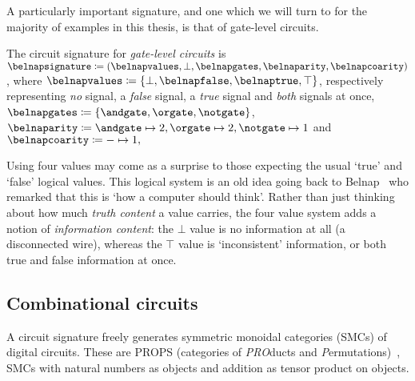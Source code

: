\documentclass{lmcs}
\begin{document}
A particularly important signature, and one which we will turn to for the
majority of examples in this thesis, is that of gate-level circuits.

\begin{exa}\label{ex:belnap-signature}
    The circuit signature for \emph{gate-level circuits} is \(
    \belnapsignature \coloneqq (
    \belnapvalues,
    \bot,
    \belnapgates,
    \belnaparity,
    \belnapcoarity
    )\), where \(
    \belnapvalues \coloneqq \{\bot, \belnapfalse, \belnaptrue, \top\}
    \), respectively representing \emph{no} signal, a \emph{false} signal, a
    \emph{true} signal and \emph{both} signals at once, \(
    \belnapgates \coloneqq \{\andgate,\orgate,\notgate\}
    \), \(
    \belnaparity \coloneqq
    \andgate \mapsto 2,
    \orgate \mapsto 2,
    \notgate \mapsto 1
    \) and \(
    \belnapcoarity \coloneqq - \mapsto 1,
    \)
\end{exa}

\begin{rem}
    Using four values may come as a surprise to those expecting the usual
    `true' and `false' logical values.
    This logical system is an old idea going back to
    Belnap~\cite{belnap1977useful} who remarked that this is `how a computer
    should think'.
    Rather than just thinking about how much \emph{truth content} a value
    carries, the four value system adds a notion of \emph{information content}:
    the \(\bot\) value is no information at all (a disconnected wire), whereas
    the \(\top\) value is `inconsistent' information, or both true and false
    information at once.
\end{rem}

\subsection{Combinational circuits}

A circuit signature freely generates symmetric monoidal categories (SMCs) of
digital circuits.
These are PROPS (categories of \emph{PRO}ducts and
\emph{P}ermutations)~\cite{maclane1965categorical}, SMCs with natural numbers as
objects and addition as tensor product on objects.
\end{document}
